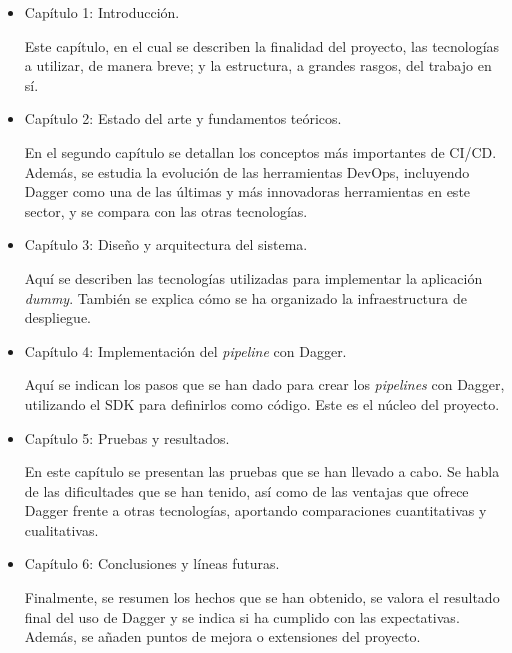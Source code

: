 \begin{itemize}
  \item Capítulo 1: Introducción.

    Este capítulo, en el cual se describen la finalidad del proyecto, las tecnologías a utilizar, de manera breve; y la estructura, a grandes rasgos, del trabajo en sí.

  \item Capítulo 2: Estado del arte y fundamentos teóricos.

    En el segundo capítulo se detallan los conceptos más importantes de CI/CD. Además, se estudia la evolución de las herramientas DevOps\cite{devops}, incluyendo Dagger como una de las últimas y más innovadoras herramientas en este sector, y se compara con las otras tecnologías.
  \item Capítulo 3: Diseño y arquitectura del sistema.

    Aquí se describen las tecnologías utilizadas para implementar la aplicación \textit{dummy}. También se explica cómo se ha organizado la infraestructura de despliegue.
  \item Capítulo 4: Implementación del \textit{pipeline} con Dagger.

    Aquí se indican los pasos que se han dado para crear los \textit{pipelines} con Dagger, utilizando el SDK para definirlos como código. Este es el núcleo del proyecto.
  \item Capítulo 5: Pruebas y resultados.

    En este capítulo se presentan las pruebas que se han llevado a cabo. Se habla de las dificultades que se han tenido, así como de las ventajas que ofrece Dagger frente a otras tecnologías, aportando comparaciones cuantitativas y cualitativas.
  \item Capítulo 6: Conclusiones y líneas futuras.

    Finalmente, se resumen los hechos que se han obtenido, se valora el resultado final del uso de Dagger y se indica si ha cumplido con las expectativas. Además, se añaden puntos de mejora o extensiones del proyecto.
\end{itemize}
